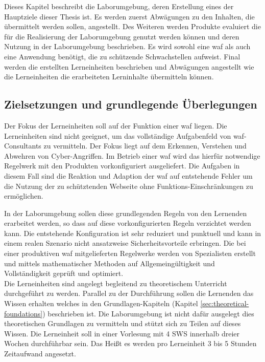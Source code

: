 Dieses Kapitel beschreibt die Laborumgebung, deren Erstellung eines der Hauptziele dieser Thesis ist.
Es werden zuerst Abwägungen zu den Inhalten, die übermittelt werden sollen, angestellt.
Des Weiteren werden Produkte evaluiert die für die Realisierung der Laborumgebung genutzt werden können und deren Nutzung in der Laborumgebung beschrieben.
Es wird sowohl eine \ac{waf} als auch eine Anwendung benötigt, die zu schützende Schwachstellen aufweist.
Final werden die erstellten Lerneinheiten beschrieben und Abwägungen angestellt wie die Lerneinheiten die erarbeiteten Lerninhalte übermitteln können.

\subsection{Zielsetzungen und grundlegende Überlegungen}
\label{sec:learnings-metha}

Der Fokus der Lerneinheiten soll auf der Funktion einer \ac{waf} liegen.
Die Lerneinheiten sind nicht geeignet, um das vollständige Aufgabenfeld  von \ac{waf}-Consultants zu vermitteln.
Der Fokus liegt auf dem Erkennen, Verstehen und Abwehren von Cyber-Angriffen.
Im Betrieb einer \ac{waf} wird das hierfür notwendige Regelwerk mit den Produkten vorkonfiguriert ausgeliefert.
Die Aufgaben in diesem Fall sind die Reaktion und Adaption der \ac{waf} auf entstehende Fehler um die Nutzung der zu schütztenden Webseite ohne Funktions-Einschränkungen zu ermöglichen.

In der Laborumgebung sollen diese grundlegenden Regeln von den Lernenden erarbeitet werden, so dass auf diese vorkonfigurierten Regeln verzichtet werden kann.
Die entstehende Konfiguration ist sehr reduziert und punktuell und kann in einem realen Szenario nicht ansatzweise Sicherheitsvorteile erbringen.
Die bei einer produktiven \ac{waf} mitgelieferten Regelwerke werden von Spezialisten erstellt und mittels mathematischer Methoden auf Allgemeingültigkeit und Vollständigkeit geprüft und optimiert. \\

Die Lerneinheiten sind angelegt begleitend zu theoretischem Unterricht durchgeführt zu werden.
Parallel zu der Durchführung sollen die Lernenden das Wissen erhalten welches in den Grundlagen-Kapiteln (Kapitel \ref{sec:theoretical-foundations}) beschrieben ist.
Die Laborumgebung ist nicht dafür ausgelegt dies theoretischen Grundlagen zu vermitteln und stützt sich zu Teilen auf dieses Wissen.
Die Lerneinheit soll in einer Vorlesung mit 4 SWS innerhalb dreier Wochen durchführbar sein.
Das Heißt es werden pro Lerneinheit 3 bis 5 Stunden Zeitaufwand angesetzt.

